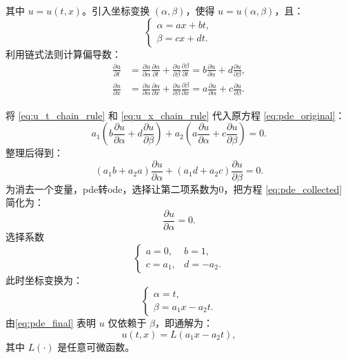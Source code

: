 \documentclass[12pt,a4paper]{article}
\numberwithin{subsection}{section}   %
\numberwithin{subsubsection}{subsection}
\theoremstyle{plain}
\theoremstyle{definition}
\theoremstyle{remark}
\theoremstyle{remark}
\begin{document}
	其中 $u = u(t,x)$。引入坐标变换 $(\alpha, \beta)$，使得 $u = u(\alpha, \beta)$，且：
	\begin{equation} \label{eq:coordinate_transform}
		\begin{cases}
			\alpha = ax + bt, \\
			\beta = cx + dt.
		\end{cases}
	\end{equation}
	利用链式法则计算偏导数：
	\begin{align}
		\frac{\partial u}{\partial t} 
		&= \frac{\partial u}{\partial \alpha} \frac{\partial \alpha}{\partial t} + \frac{\partial u}{\partial \beta} \frac{\partial \beta}{\partial t} 
		= b\frac{\partial u}{\partial \alpha} + d\frac{\partial u}{\partial \beta}, \label{eq:u_t_chain_rule} \\
		\frac{\partial u}{\partial x} 
		&= \frac{\partial u}{\partial \alpha} \frac{\partial \alpha}{\partial x} + \frac{\partial u}{\partial \beta} \frac{\partial \beta}{\partial x} 
		= a\frac{\partial u}{\partial \alpha} + c\frac{\partial u}{\partial \beta}. \label{eq:u_x_chain_rule}
	\end{align}
	
	将 \eqref{eq:u_t_chain_rule} 和 \eqref{eq:u_x_chain_rule} 代入原方程 \eqref{eq:pde_original}：
	\begin{equation} \label{eq:pde_transformed}
		a_1 \left( b \frac{\partial u}{\partial \alpha} + d \frac{\partial u}{\partial \beta} \right) + a_2 \left( a \frac{\partial u}{\partial \alpha} + c \frac{\partial u}{\partial \beta} \right) = 0.
	\end{equation}
	整理后得到：
	\begin{equation} \label{eq:pde_collected}
		(a_1 b + a_2 a) \frac{\partial u}{\partial \alpha} + (a_1 d + a_2 c) \frac{\partial u}{\partial \beta} = 0.
	\end{equation}
	为消去一个变量，pde转ode，选择让第二项系数为0，把方程 \eqref{eq:pde_collected} 简化为：
	\begin{equation} \label{eq:pde_final}
		\frac{\partial u}{\partial \alpha} = 0.
	\end{equation}
	选择系数
	\begin{equation} \label{eq:constant_choice}
		\begin{cases}
			a = 0, & b = 1, \\
			c = a_1, & d = -a_2.
		\end{cases}
	\end{equation}
	此时坐标变换为：
	\begin{equation} \label{eq:coordinates_specific}
		\begin{cases}
			\alpha = t, \\
			\beta = a_1 x - a_2 t.
		\end{cases}
	\end{equation}
	由\eqref{eq:pde_final} 表明 $u$ 仅依赖于 $\beta$，即通解为：
	\begin{equation} \label{eq:solution}
		u(t,x) = L(a_1 x - a_2 t),
	\end{equation}
	其中
	$L(\cdot)$ 是任意可微函数。
	
\end{document}
